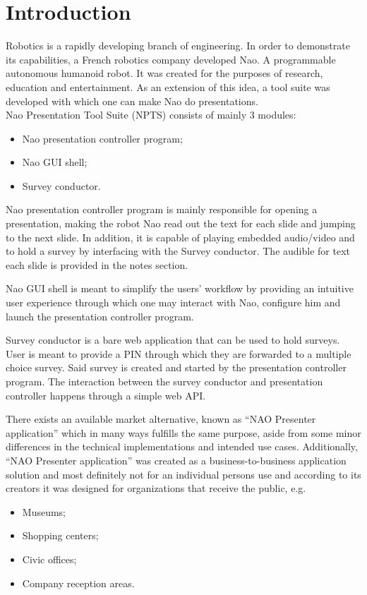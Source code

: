 \documentclass[12pt, fleqn, a4paper]{article}
\begin{document}
\section*{\centering Introduction}
Robotics is a rapidly developing branch of engineering. In order to demonstrate its capabilities, a French robotics company developed Nao. A programmable autonomous humanoid robot. It was created for the purposes of research, education and entertainment. As an extension of this idea, a tool suite was developed with which one can make Nao do presentations.\\
Nao Presentation Tool Suite (NPTS) consists of mainly 3 modules:
\begin{itemize}
	\item Nao presentation controller program;
	\item Nao GUI shell;
	\item Survey conductor.
\end{itemize}\par
Nao presentation controller program is mainly responsible for opening a presentation, making the robot Nao read out the text for each slide and jumping to the next slide. In addition, it is capable of playing embedded audio/video and to hold a survey by interfacing with the Survey conductor. The audible for text each slide is provided in the notes section. \par
Nao GUI shell is meant to simplify the users' workflow by providing an intuitive user experience through which one may interact with Nao, configure him and launch the presentation controller program.\par
Survey conductor is a bare web application that can be used to hold surveys. User is meant to provide a PIN through which they are forwarded to a multiple choice survey. Said survey is created and started by the presentation controller program. The interaction between the survey conductor and presentation controller happens through a simple web API.\par
There exists an available market alternative, known as \enquote{NAO Presenter application} which in many ways fulfills the same purpose, aside from some minor differences in the technical implementations and intended use cases. Additionally, \enquote{NAO Presenter application} was created as a business-to-business application solution and most definitely not for an individual persons use and according to its creators it was designed for organizations that receive the public, e.g.
\begin{itemize}
	\item Museums;
	\item Shopping centers;
	\item Civic offices;
	\item Company reception areas.
\end{itemize}
\end{document}

